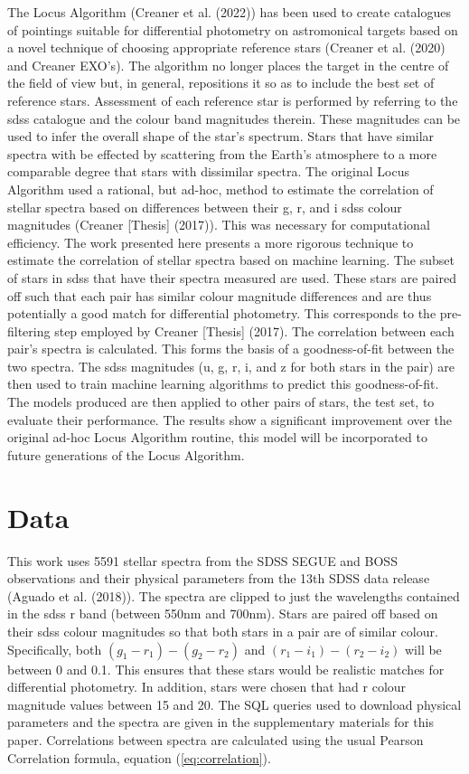 \documentclass[]{elsarticle} %
\begin{document}
The Locus Algorithm (Creaner et al. (2022)) has been used to create
catalogues of pointings suitable for differential photometry on
astromonical targets based on a novel technique of choosing appropriate
reference stars (Creaner et al. (2020) and Creaner EXO's). The algorithm
no longer places the target in the centre of the field of view but, in
general, repositions it so as to include the best set of reference
stars. Assessment of each reference star is performed by referring to
the sdss catalogue and the colour band magnitudes therein. These
magnitudes can be used to infer the overall shape of the star's
spectrum. Stars that have similar spectra with be effected by scattering
from the Earth's atmosphere to a more comparable degree that stars with
dissimilar spectra. The original Locus Algorithm used a rational, but
ad-hoc, method to estimate the correlation of stellar spectra based on
differences between their g, r, and i sdss colour magnitudes (Creaner
{[}Thesis{]} (2017)). This was necessary for computational efficiency.
The work presented here presents a more rigorous technique to estimate
the correlation of stellar spectra based on machine learning. The subset
of stars in sdss that have their spectra measured are used. These stars
are paired off such that each pair has similar colour magnitude
differences and are thus potentially a good match for differential
photometry. This corresponds to the pre-filtering step employed by
Creaner {[}Thesis{]} (2017). The correlation between each pair's spectra
is calculated. This forms the basis of a goodness-of-fit between the two
spectra. The sdss magnitudes (u, g, r, i, and z for both stars in the
pair) are then used to train machine learning algorithms to predict this
goodness-of-fit. The models produced are then applied to other pairs of
stars, the test set, to evaluate their performance. The results show a
significant improvement over the original ad-hoc Locus Algorithm
routine, this model will be incorporated to future generations of the
Locus Algorithm.

\hypertarget{data}{%
\section{Data}\label{data}}

This work uses 5591 stellar spectra from the SDSS SEGUE and BOSS
observations and their physical parameters from the 13th SDSS data
release (Aguado et al. (2018)). The spectra are clipped to just the
wavelengths contained in the sdss r band (between 550nm and 700nm).
Stars are paired off based on their sdss colour magnitudes so that both
stars in a pair are of similar colour. Specifically, both
\((g_1-r_1)-(g_2-r_2)\) and \((r_1-i_1)-(r_2-i_2)\) will be between 0
and 0.1. This ensures that these stars would be realistic matches for
differential photometry. In addition, stars were chosen that had r
colour magnitude values between 15 and 20. The SQL queries used to
download physical parameters and the spectra are given in the
supplementary materials for this paper. Correlations between spectra are
calculated using the usual Pearson Correlation formula, equation
(\ref{eq:correlation}).
\end{document}
